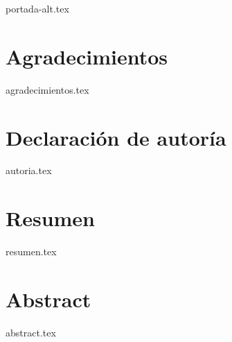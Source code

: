 \documentclass[twoside,openright,11pt]{report}
\begin{document}
\renewcommand{\figurename}{Imagen}
\renewcommand{\listfigurename}{Lista de Imágenes}




\thispagestyle{empty}
{portada-alt.tex}

\newpage


\chapter*{Agradecimientos}

{agradecimientos.tex}

\chapter*{Declaración de autoría}


{autoria.tex}



\chapter*{Resumen}

{resumen.tex}


\chapter*{Abstract}

{abstract.tex}


\tableofcontents
\thispagestyle{plain}
\end{document}
